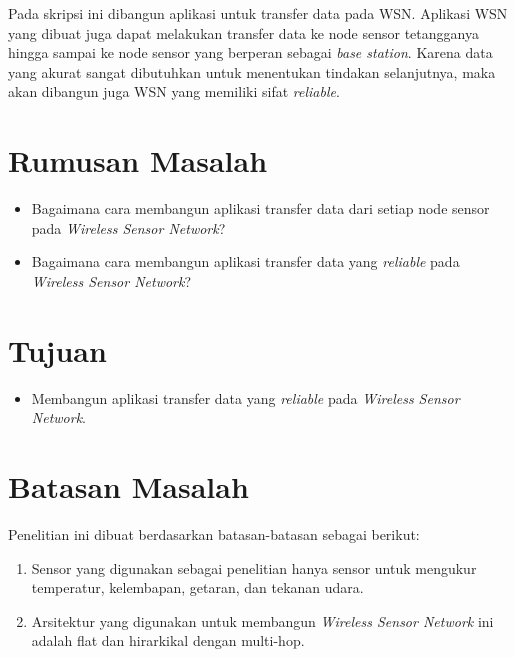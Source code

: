 Pada skripsi ini dibangun aplikasi untuk transfer data pada WSN. Aplikasi WSN yang dibuat juga dapat melakukan transfer data ke node sensor tetangganya hingga sampai ke node sensor yang berperan sebagai \textit{base station}. Karena data yang akurat sangat dibutuhkan untuk menentukan tindakan selanjutnya, maka akan dibangun juga WSN yang memiliki sifat \textit{reliable}.


\section{Rumusan Masalah}
\label{sec:rumusan}
\begin{itemize}
	\item Bagaimana cara membangun aplikasi transfer data dari setiap node sensor pada \textit{Wireless Sensor Network}?
	\item Bagaimana cara membangun aplikasi transfer data yang \textit{reliable} pada \textit{Wireless Sensor Network}?
\end{itemize}

\section{Tujuan}
\label{sec:tujuan}
\begin{itemize}
 \item Membangun aplikasi transfer data yang \textit{reliable} pada \textit{Wireless Sensor Network}.
\end{itemize}

\section{Batasan Masalah}
\label{sec:batasan}
Penelitian ini dibuat berdasarkan batasan-batasan sebagai berikut:
\begin{enumerate}
	\item Sensor yang digunakan sebagai penelitian hanya sensor untuk mengukur temperatur, kelembapan, getaran, dan tekanan udara.
	\item Arsitektur yang digunakan untuk membangun \textit{Wireless Sensor Network} ini adalah flat dan hirarkikal dengan multi-hop.
\end{enumerate}

